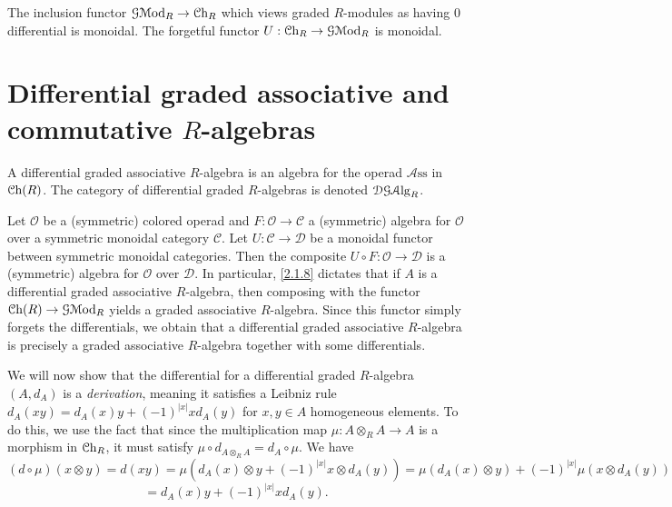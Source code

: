 \begin{corollary}\label{2.1.11}
	The inclusion functor $\mathcal{G} \mathcal{M}\mathrm{od} _R \to \mathcal{C}\mathrm{h}_{R} $ which views graded $R$-modules as having 0 differential is monoidal. The forgetful functor $U : \mathcal{C}\mathrm{h}_{R}  \to \mathcal{G} \mathcal{M}\mathrm{od} _R$ is monoidal.
\end{corollary}



\section{Differential graded associative and commutative $R$-algebras}\label{sec:2.2}

\begin{definition}\label{2.2.1}
	A differential graded associative $R$-algebra is an algebra for the operad $\mathcal{A} \mathrm{ss} $ in $\mathcal{C}\mathrm{h}(R) $. The category of differential graded $R$-algebras is denoted $\mathcal{DG} \mathcal{A}\mathrm{lg}_R$.
\end{definition}

\begin{remark}\label{2.2.2}
	Let $\mathcal{O} $ be a (symmetric) colored operad and $F : \mathcal{O}  \to \mathcal{C} $ a (symmetric) algebra for $\mathcal{O} $ over a symmetric monoidal category $\mathcal{C} $. Let $U : \mathcal{C}  \to \mathcal{D} $ be a monoidal functor between symmetric monoidal categories. Then the composite $U\circ F : \mathcal{O}  \to \mathcal{D} $ is a (symmetric) algebra for $\mathcal{O} $ over $\mathcal{D} $. In particular, \cref{2.1.8} dictates that if $A$ is a differential graded associative $R$-algebra, then composing with the functor $\mathcal{C}\mathrm{h}(R) \to \mathcal{G}\mathcal{M}\mathrm{od}_R$ yields a graded associative $R$-algebra. Since this functor simply forgets the differentials, we obtain that a differential graded associative $R$-algebra is precisely a graded associative $R$-algebra together with some differentials.
\end{remark}

\begin{discussion}\label{2.2.3}
	We will now show that the differential for a differential graded $R$-algebra $(A,d_A)$ is a \emph{derivation}, meaning it satisfies a Leibniz rule $d_A(xy) = d_A(x)y + (-1)^{\left| x \right| } xd_A(y)$ for $x,y\in A$ homogeneous elements. To do this, we use the fact that since the multiplication map $\mu : A\otimes _RA \to A$ is a morphism in $\mathcal{C}\mathrm{h}_{R} $, it must satisfy $\mu \circ d_{A\otimes_RA} =d_A \circ \mu $. We have
	\[
		(d\circ \mu )(x\otimes y) = d(xy) = \mu \left( d_A(x)\otimes y + (-1)^{\left| x \right| } x\otimes d_A(y) \right) =\mu \left( d_A(x)\otimes y \right) +(-1)^{\left| x \right| } \mu \left( x\otimes d_A(y) \right) 
	\]
	\[
		=d_A(x)y+(-1)^{\left| x \right| } xd_A(y)
	.\]
\end{discussion}

